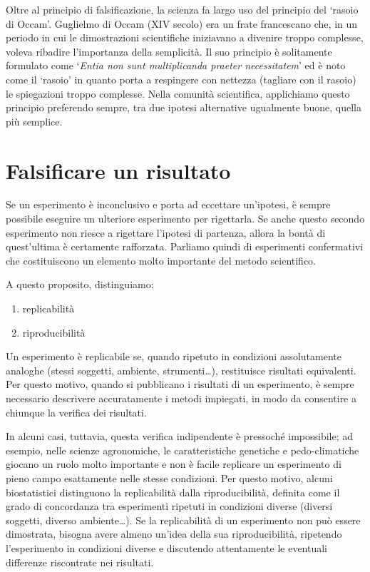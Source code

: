 \documentclass[
  12pt,
]{book}
\providecommand{\tightlist}{%
  \setlength{\itemsep}{0pt}\setlength{\parskip}{0pt}}
\begin{document}
Oltre al principio di falsificazione, la scienza fa largo uso del principio del `rasoio di Occam'. Guglielmo di Occam (XIV secolo) era un frate francescano che, in un periodo in cui le dimostrazioni scientifiche iniziavano a divenire troppo complesse, voleva ribadire l'importanza della semplicità. Il suo principio è solitamente formulato come `\emph{Entia non sunt multiplicanda praeter necessitatem}' ed è noto come il `rasoio' in quanto porta a respingere con nettezza (tagliare con il rasoio) le spiegazioni troppo complesse. Nella comunità scientifica, applichiamo questo principio preferendo sempre, tra due ipotesi alternative ugualmente buone, quella più semplice.

\hypertarget{falsificare-un-risultato}{%
\section{Falsificare un risultato}\label{falsificare-un-risultato}}

Se un esperimento è inconclusivo e porta ad eccettare un'ipotesi, è sempre possibile eseguire un ulteriore esperimento per rigettarla. Se anche questo secondo esperimento non riesce a rigettare l'ipotesi di partenza, allora la bontà di quest'ultima è certamente rafforzata. Parliamo quindi di esperimenti confermativi che costituiscono un elemento molto importante del metodo scientifico.

A questo proposito, distinguiamo:

\begin{enumerate}
\def\labelenumi{\arabic{enumi}.}
\tightlist
\item
  replicabilità
\item
  riproducibilità
\end{enumerate}

Un esperimento è replicabile se, quando ripetuto in condizioni assolutamente analoghe (stessi soggetti, ambiente, strumenti\ldots), restituisce risultati equivalenti. Per questo motivo, quando si pubblicano i risultati di un esperimento, è sempre necessario descrivere accuratamente i metodi impiegati, in modo da consentire a chiunque la verifica dei risultati.

In alcuni casi, tuttavia, questa verifica indipendente è pressoché impossibile; ad esempio, nelle scienze agronomiche, le caratteristiche genetiche e pedo-climatiche giocano un ruolo molto importante e non è facile replicare un esperimento di pieno campo esattamente nelle stesse condizioni. Per questo motivo, alcuni biostatistici distinguono la replicabilità dalla riproducibilità, definita come il grado di concordanza tra esperimenti ripetuti in condizioni diverse (diversi soggetti, diverso ambiente\ldots). Se la replicabilità di un esperimento non può essere dimostrata, bisogna avere almeno un'idea della sua riproducibilità, ripetendo l'esperimento in condizioni diverse e discutendo attentamente le eventuali differenze riscontrate nei risultati.
\end{document}
